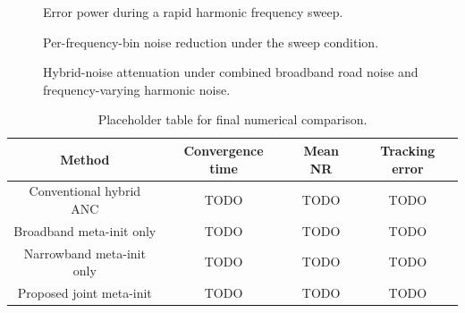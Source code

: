 \documentclass{internoise2026}
\begin{document}
\begin{figure}[htbp!]
  \centering
  \caption{Error power during a rapid harmonic frequency sweep.}
  \label{fig:sweep_error}
\end{figure}

\begin{figure}[htbp!]
  \centering
  \caption{Per-frequency-bin noise reduction under the sweep condition.}
  \label{fig:per_bin_nr}
\end{figure}

\begin{figure}[htbp!]
  \centering
  \caption{Hybrid-noise attenuation under combined broadband road noise and frequency-varying harmonic noise.}
  \label{fig:hybrid_result}
\end{figure}

\begin{table}[htbp!]
\caption{Placeholder table for final numerical comparison.}
\label{tab:result_summary}
\centering
\begin{tabular}{c c c c}
\hline
\textbf{Method} & \textbf{Convergence time} & \textbf{Mean NR} & \textbf{Tracking error} \\
\hline
Conventional hybrid ANC & TODO & TODO & TODO \\
Broadband meta-init only & TODO & TODO & TODO \\
Narrowband meta-init only & TODO & TODO & TODO \\
Proposed joint meta-init & TODO & TODO & TODO \\
\hline
\end{tabular}
\end{table}
\end{document}
